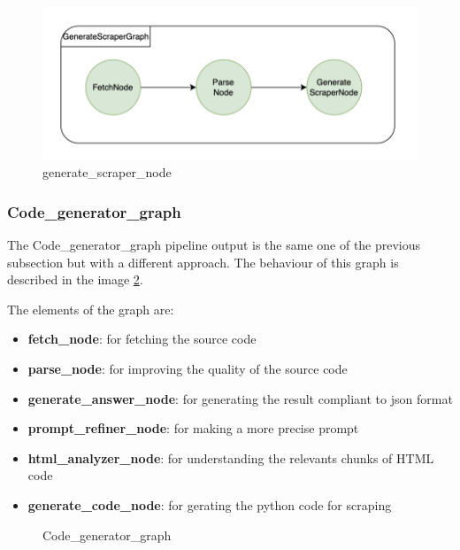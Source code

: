 \begin{figure}[H!]
    \centering
    \includegraphics[width=0.85\linewidth]{Assets/generate_script_graph.png}
    \caption{generate\_scraper\_node}
    \label{fig:enter-label}
\end{figure}
\subsubsection{Code\_generator\_graph}

The Code\_generator\_graph pipeline output is the same one of the previous subsection but with a different approach. The behaviour of this graph is described in the image \ref{fig:code-generator}.

The elements of the graph are:
\begin{itemize}
    \item \textbf{fetch\_node}: for fetching the source code
    \item \textbf{parse\_node}: for improving the quality of the source code 
    \item \textbf{generate\_answer\_node}: for generating the result compliant to json format
    \item \textbf{prompt\_refiner\_node}: for making a more precise prompt
    \item \textbf{html\_analyzer\_node}: for understanding the relevants chunks of HTML code 
    \item \textbf{generate\_code\_node}: for gerating the python code for scraping
\end{itemize}

\begin{figure}[H!]
    \centering
    \caption{Code\_generator\_graph}
    \label{fig:code-generator}
\end{figure}



